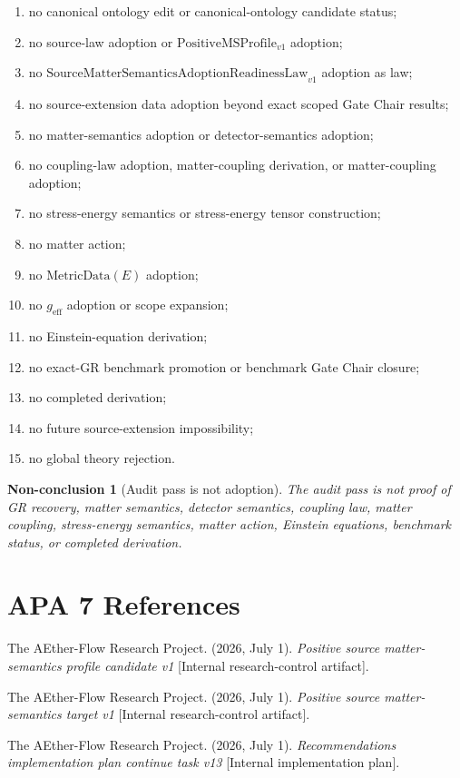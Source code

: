 \documentclass[11pt]{article}
\newcommand{\SMSAR}{\mathrm{SourceMatterSemanticsAdoptionReadinessLaw}_{v1}}
\newcommand{\PMSProf}{\mathrm{PositiveMSProfile}_{v1}}
\newcommand{\MetricData}{\mathrm{MetricData}}
\newcommand{\geff}{g_{\mathrm{eff}}}
\newtheorem{nonconclusion}{Non-conclusion}
\begin{document}
\begin{enumerate}[leftmargin=*]
  \item no canonical ontology edit or canonical-ontology candidate status;
  \item no source-law adoption or \(\PMSProf\) adoption;
  \item no \(\SMSAR\) adoption as law;
  \item no source-extension data adoption beyond exact scoped Gate Chair results;
  \item no matter-semantics adoption or detector-semantics adoption;
  \item no coupling-law adoption, matter-coupling derivation, or matter-coupling adoption;
  \item no stress-energy semantics or stress-energy tensor construction;
  \item no matter action;
  \item no \(\MetricData(E)\) adoption;
  \item no \(\geff\) adoption or scope expansion;
  \item no Einstein-equation derivation;
  \item no exact-GR benchmark promotion or benchmark Gate Chair closure;
  \item no completed derivation;
  \item no future source-extension impossibility;
  \item no global theory rejection.
\end{enumerate}

\begin{nonconclusion}[Audit pass is not adoption]
The audit pass is not proof of GR recovery, matter semantics, detector
semantics, coupling law, matter coupling, stress-energy semantics, matter
action, Einstein equations, benchmark status, or completed derivation.
\end{nonconclusion}

\section{APA 7 References}

The AEther-Flow Research Project. (2026, July 1).
\emph{Positive source matter-semantics profile candidate v1}
[Internal research-control artifact].

The AEther-Flow Research Project. (2026, July 1).
\emph{Positive source matter-semantics target v1}
[Internal research-control artifact].

The AEther-Flow Research Project. (2026, July 1).
\emph{Recommendations implementation plan continue task v13}
[Internal implementation plan].
\end{document}
